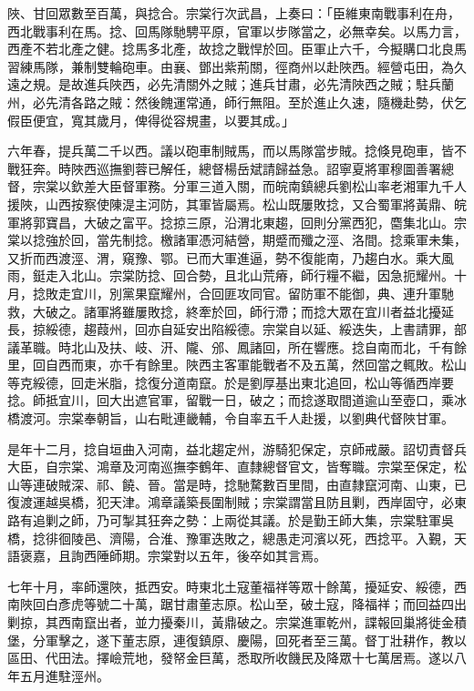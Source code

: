 \begin{pinyinscope}
陜、甘回眾數至百萬，與捻合。宗棠行次武昌，上奏曰：「臣維東南戰事利在舟，西北戰事利在馬。捻、回馬隊馳騁平原，官軍以步隊當之，必無幸矣。以馬力言，西產不若北產之健。捻馬多北產，故捻之戰悍於回。臣軍止六千，今擬購口北良馬習練馬隊，兼制雙輪砲車。由襄、鄧出紫荊關，徑商州以赴陜西。經營屯田，為久遠之規。是故進兵陜西，必先清關外之賊；進兵甘肅，必先清陜西之賊；駐兵蘭州，必先清各路之賊：然後餽運常通，師行無阻。至於進止久速，隨機赴勢，伏乞假臣便宜，寬其歲月，俾得從容規畫，以要其成。」

六年春，提兵萬二千以西。議以砲車制賊馬，而以馬隊當步賊。捻倏見砲車，皆不戰狂奔。時陜西巡撫劉蓉已解任，總督楊岳斌請歸益急。詔寧夏將軍穆圖善署總督，宗棠以欽差大臣督軍務。分軍三道入關，而皖南鎮總兵劉松山率老湘軍九千人援陜，山西按察使陳湜主河防，其軍皆屬焉。松山既屢敗捻，又合蜀軍將黃鼎、皖軍將郭寶昌，大破之富平。捻掠三原，沿渭北東趨，回則分黨西犯，麕集北山。宗棠以捻強於回，當先制捻。檄諸軍憑河結營，期蹙而殲之涇、洛間。捻乘軍未集，又折而西渡涇、渭，窺豫、鄂。已而大軍進逼，勢不復能南，乃趨白水。乘大風雨，鋌走入北山。宗棠防捻、回合勢，且北山荒瘠，師行糧不繼，因急扼耀州。十月，捻敗走宜川，別黨果竄耀州，合回匪攻同官。留防軍不能御，典、連升軍馳救，大破之。諸軍將雖屢敗捻，終牽於回，師行滯；而捻大眾在宜川者益北擾延長，掠綏德，趨葭州，回亦自延安出陷綏德。宗棠自以延、綏迭失，上書請罪，部議革職。時北山及扶、岐、汧、隴、邠、鳳諸回，所在響應。捻自南而北，千有餘里，回自西而東，亦千有餘里。陜西主客軍能戰者不及五萬，然回當之輒敗。松山等克綏德，回走米脂，捻復分道南竄。於是劉厚基出東北追回，松山等循西岸要捻。師抵宜川，回大出遮官軍，留戰一日，破之；而捻遂取間道逾山至壺口，乘冰橋渡河。宗棠奉朝旨，山右毗連畿輔，令自率五千人赴援，以劉典代督陜甘軍。

是年十二月，捻自垣曲入河南，益北趨定州，游騎犯保定，京師戒嚴。詔切責督兵大臣，自宗棠、鴻章及河南巡撫李鶴年、直隸總督官文，皆奪職。宗棠至保定，松山等連破賊深、祁、饒、晉。當是時，捻馳騖數百里間，由直隸竄河南、山東，已復渡運越吳橋，犯天津。鴻章議築長圍制賊；宗棠謂當且防且剿，西岸固守，必東路有追剿之師，乃可掣其狂奔之勢：上兩從其議。於是勤王師大集，宗棠駐軍吳橋，捻徘徊陵邑、濟陽，合淮、豫軍迭敗之，總愚走河濱以死，西捻平。入覲，天語褒嘉，且詢西陲師期。宗棠對以五年，後卒如其言焉。

七年十月，率師還陜，抵西安。時東北土寇董福祥等眾十餘萬，擾延安、綏德，西南陜回白彥虎等號二十萬，踞甘肅董志原。松山至，破土寇，降福祥；而回益四出剿掠，其西南竄出者，並力擾秦川，黃鼎破之。宗棠進軍乾州，諜報回巢將徙金積堡，分軍擊之，遂下董志原，連復鎮原、慶陽，回死者至三萬。督丁壯耕作，教以區田、代田法。擇嶮荒地，發帑金巨萬，悉取所收饑民及降眾十七萬居焉。遂以八年五月進駐涇州。


\end{pinyinscope}
